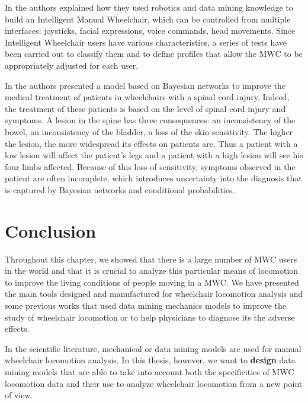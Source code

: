 In \cite{faria2012patient} the authors explained how they used robotics and data mining knowledge to build an Intelligent Manual Wheelchair, which can be controlled from multiple interfaces: joysticks, facial expressions, voice commands, head movements.  Since Intelligent Wheelchair users have various characteristics, a series of tests have been carried out to classify them and to define profiles that allow the MWC to be appropriately adjusted  for each user.

In \cite{athanasiou2009bayesian} the authors presented a model based on Bayesian networks to improve the medical treatment of patients in wheelchairs with a spinal cord injury. Indeed, the treatment of these patients  is based on the level of spinal cord injury and symptoms. A lesion in the spine has three consequences: an inconsistency of the bowel, an inconsistency of the bladder, a loss of the skin sensitivity. The higher the lesion, the more widespread its effects on patients are. Thus a patient with a low lesion will affect the patient's legs  and a patient with a high lesion will see his four limbs affected. Because of this loss of sensitivity, symptoms observed in the patient are often incomplete, which introduces uncertainty into the diagnosis that is captured by Bayesian networks and conditional probabilities.





\section{Conclusion}



Throughout this chapter, we showed that there is a large number of MWC users in the world and that it is crucial to analyze this particular means of locomotion to improve the living conditions of people moving in a MWC. We have presented the main tools designed and manufactured for wheelchair locomotion analysis and some previous works that used data mining mechanics models to improve the study of wheelchair locomotion or  to  help physicians to diagnose its the adverse effects. 


In the scientific literature,  mechanical or data mining models are used for manual wheelchair locomotion analysis.  In this thesis, however, we want to \textbf{design} data mining models that are able to take into account both the specificities of MWC locomotion data and their use to analyze wheelchair locomotion from a new point of view. 


